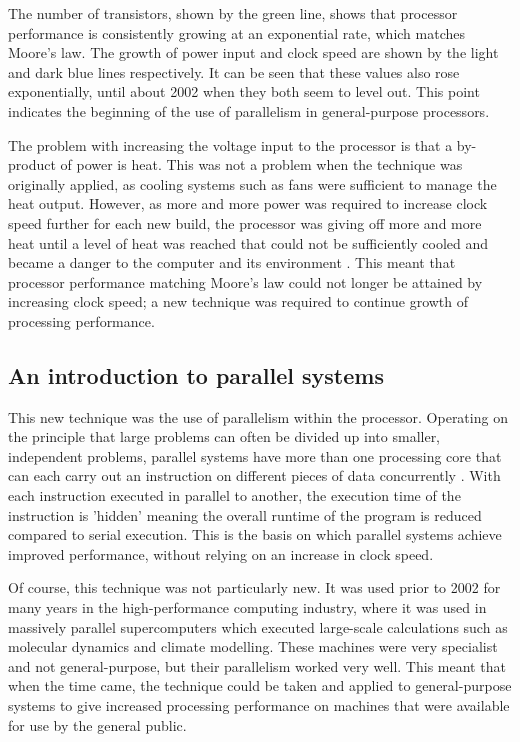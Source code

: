 \documentclass[a4paper, 12pt]{article}
\begin{document}
The number of transistors, shown by the green line, shows that processor performance is consistently growing at an exponential rate, which matches Moore's law. The growth of power input and clock speed are shown by the light and dark blue lines respectively. It can be seen that these values also rose exponentially, until about 2002 when they both seem to level out. This point indicates the beginning of the use of parallelism in general-purpose processors.

The problem with increasing the voltage input to the processor is that a by-product of power is heat. This was not a problem when the technique was originally applied, as cooling systems such as fans were sufficient to manage the heat output. However, as more and more power was required to increase clock speed further for each new build, the processor was giving off more and more heat until a level of heat was reached that could not be sufficiently cooled and became a danger to the computer and its environment \cite{Adv08}. This meant that processor performance matching Moore's law could not longer be attained by increasing clock speed; a new technique was required to continue growth of processing performance.

\subsection{An introduction to parallel systems}

This new technique was the use of parallelism within the processor. Operating on the principle that large problems can often be divided up into smaller, independent problems, parallel systems have more than one processing core that can each carry out an instruction on different pieces of data concurrently \cite{Got89}. With each instruction executed in parallel to another, the execution time of the instruction is 'hidden' meaning the overall runtime of the program is reduced compared to serial execution. This is the basis on which parallel systems achieve improved performance, without relying on an increase in clock speed.

Of course, this technique was not particularly new. It was used prior to 2002 for many years in the high-performance computing industry, where it was used in massively parallel supercomputers which executed large-scale calculations such as molecular dynamics and climate modelling. These machines were very specialist and not general-purpose, but their parallelism worked very well. This meant that when the time came, the technique could be taken and applied to general-purpose systems to give increased processing performance on machines that were available for use by the general public.
\end{document}

